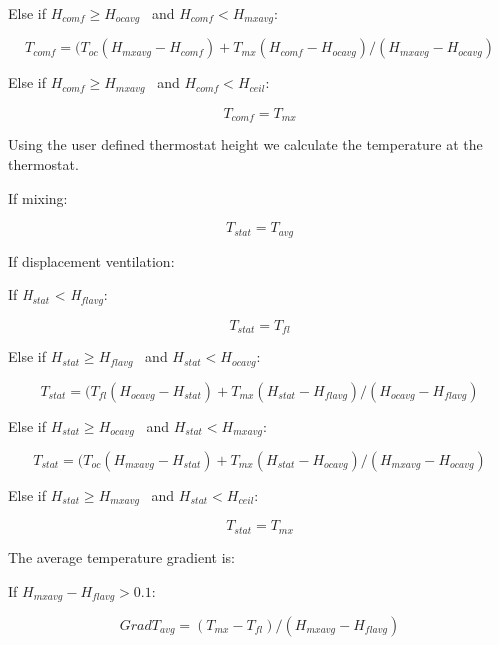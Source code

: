 Else if \({H_{comf}} \ge {H_{ocavg}}\) ~and \({H_{comf}} < {H_{mxavg}}\):

\begin{equation}
{T_{comf}} = ({T_{oc}}({H_{mxavg}} - {H_{comf}}) + {T_{mx}}({H_{comf}} - {H_{ocavg}})/({H_{mxavg}} - {H_{ocavg}})
\end{equation}

Else if \({H_{comf}} \ge {H_{mxavg}}\) ~and \({H_{comf}} < {H_{ceil}}\):

\begin{equation}
{T_{comf}} = {T_{mx}}
\end{equation}

Using the user defined thermostat height we calculate the temperature at the thermostat.

If mixing:

\begin{equation}
{T_{stat}} = {T_{avg}}
\end{equation}

If displacement ventilation:

If \emph{H\(_{stat}\)} \textless{} \emph{H\(_{flavg}\)}:

\begin{equation}
{T_{stat}} = {T_{fl}}
\end{equation}

Else if \({H_{stat}} \ge {H_{flavg}}\) ~and \({H_{stat}} < {H_{ocavg}}\):

\begin{equation}
{T_{stat}} = ({T_{fl}}({H_{ocavg}} - {H_{stat}}) + {T_{mx}}({H_{stat}} - {H_{flavg}})/({H_{ocavg}} - {H_{flavg}})
\end{equation}

Else if \({H_{stat}} \ge {H_{ocavg}}\) ~and \({H_{stat}} < {H_{mxavg}}\):

\begin{equation}
{T_{stat}} = ({T_{oc}}({H_{mxavg}} - {H_{stat}}) + {T_{mx}}({H_{stat}} - {H_{ocavg}})/({H_{mxavg}} - {H_{ocavg}})
\end{equation}

Else if \({H_{stat}} \ge {H_{mxavg}}\) ~and \({H_{stat}} < {H_{ceil}}\):

\begin{equation}
{T_{stat}} = {T_{mx}}
\end{equation}

The average temperature gradient is:

If \({H_{mxavg}} - {H_{flavg}} > 0.1\):

\begin{equation}
Grad{T_{avg}} = ({T_{mx}} - {T_{fl}})/({H_{mxavg}} - {H_{flavg}})
\end{equation}

